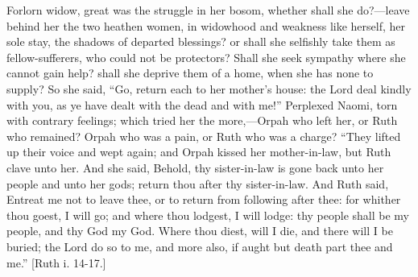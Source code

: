 Forlorn widow, great was the struggle in her bosom, whether shall
she do?—leave behind her the two heathen women, in widowhood and
weakness like herself, her sole stay, the shadows of departed
blessings? or shall she selfishly take them as fellow-sufferers, who
could not be protectors? Shall she seek sympathy where she cannot gain
help? shall she deprive them of a home, when she has none to supply?
So she said, ``Go, return each to her mother's house: the Lord
deal kindly with you, as ye have dealt with the dead and with
me!'' Perplexed Naomi, torn with contrary feelings; which tried
her the more,—Orpah who left her, or Ruth who remained? Orpah who
was a pain, or Ruth who was a charge? ``They lifted up their voice
and wept again; and Orpah kissed her mother-in-law, but Ruth clave
unto her. And she said, Behold, thy sister-in-law is gone back unto
her people and unto her gods; return thou after thy sister-in-law. And
Ruth said, Entreat me not to leave thee, or to return from following
after thee: for whither thou goest, I will go; and where thou lodgest,
I will lodge: thy people shall be my people, and thy God my God. Where
thou diest, will I die, and there will I be buried; the Lord do so to
me, and more also, if aught but death part thee and me.'' [Ruth i.
14-17.]


